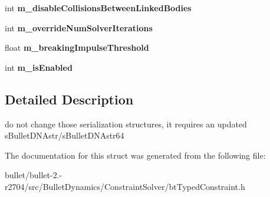 \begin{DoxyCompactItemize}
\item 
\hypertarget{structbt_typed_constraint_float_data_a1ac678e96795aa0e69e4f60d05a90a7e}{int {\bfseries m\+\_\+disable\+Collisions\+Between\+Linked\+Bodies}}\label{structbt_typed_constraint_float_data_a1ac678e96795aa0e69e4f60d05a90a7e}

\item 
\hypertarget{structbt_typed_constraint_float_data_af232f50b9f2b39f341cfbaecacb28fc8}{int {\bfseries m\+\_\+override\+Num\+Solver\+Iterations}}\label{structbt_typed_constraint_float_data_af232f50b9f2b39f341cfbaecacb28fc8}

\item 
\hypertarget{structbt_typed_constraint_float_data_aa388e15d0baab4a073d37114783def55}{float {\bfseries m\+\_\+breaking\+Impulse\+Threshold}}\label{structbt_typed_constraint_float_data_aa388e15d0baab4a073d37114783def55}

\item 
\hypertarget{structbt_typed_constraint_float_data_a9b529fe525394321de1bcbf4c7d1f5d3}{int {\bfseries m\+\_\+is\+Enabled}}\label{structbt_typed_constraint_float_data_a9b529fe525394321de1bcbf4c7d1f5d3}

\end{DoxyCompactItemize}


\subsection{Detailed Description}
do not change those serialization structures, it requires an updated s\+Bullet\+D\+N\+Astr/s\+Bullet\+D\+N\+Astr64 

The documentation for this struct was generated from the following file\+:\begin{DoxyCompactItemize}
\item 
bullet/bullet-\/2.-\/r2704/src/\+Bullet\+Dynamics/\+Constraint\+Solver/bt\+Typed\+Constraint.\+h\end{DoxyCompactItemize}
